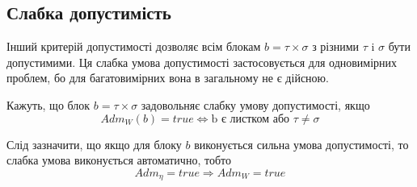 \documentclass[12pt]{report}
\begin{document}
	\subsection{ Слабка допустимість}
	\hspace{0.8cm}Інший критерій допустимості дозволяє всім блокам $b=\tau\times\sigma$ з різними $\tau$ i $\sigma$ бути допустимими. Ця слабка умова допустимості застосовується для одновимірних проблем, бо для багатовимірних вона в загальному не є дійсною.
	\begin{Def}
	Кажуть, що блок $b=\tau\times\sigma$ задовольняє слабку умову допустимості, якщо 
	$$Adm_W(b)=true\Leftrightarrow \text{b є листком або } \tau\ne\sigma $$
	\end{Def}
	\par Слід зазначити, що якщо для блоку $b$ виконується сильна умова допустимості, то слабка умова виконується автоматично, тобто 
	$$Adm_{\eta}=true\Rightarrow Adm_{W}=true$$
\end{document}

